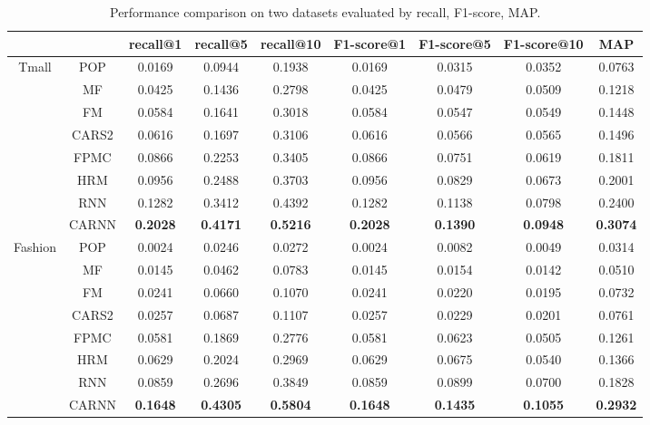 \documentclass[conference]{IEEEtran}
\begin{document}
\begin{table}[htbp]
\centering\scriptsize
\caption{Performance comparison on two datasets evaluated by recall, F1-score, MAP.}
\begin{tabular}{ccccccccc}
    \toprule
          &       & recall@1 & recall@5 & recall@10 & F1-score@1 & F1-score@5 & F1-score@10 & MAP   \\
    \midrule
    \multirow{8}[0]{*}{Tmall} 
        & POP   &0.0169    &0.0944  &0.1938  &0.0169  &0.0315  &0.0352  &0.0763 \\
        & MF    &0.0425   & 0.1436  &0.2798&  0.0425  &0.0479 & 0.0509  &0.1218 \\
        & FM   &0.0584  &0.1641  &0.3018 & 0.0584  &0.0547 & 0.0549 & 0.1448 \\
        & CARS2   &0.0616 & 0.1697  &0.3106 & 0.0616 & 0.0566 & 0.0565 & 0.1496\\
        & FPMC    &0.0866  &0.2253  &0.3405  &0.0866  &0.0751  &0.0619  &0.1811 \\
        & HRM   &0.0956  &0.2488 & 0.3703 & 0.0956 & 0.0829&  0.0673&  0.2001 \\
        & RNN   &0.1282  &0.3412&  0.4392&  0.1282 & 0.1138 &0.0798 & 0.2400 \\
        & CARNN    &\textbf{0.2028}  &\textbf{0.4171}  &\textbf{0.5216}&  \textbf{0.2028}&  \textbf{0.1390}&\textbf{ 0.0948}  &\textbf{0.3074} \\
    \midrule
    \multirow{8}[0]{*}{Fashion} 
        & POP   &0.0024  &0.0246  & 0.0272  & 0.0024   &0.0082  & 0.0049   &0.0314 \\
        & MF    & 0.0145  & 0.0462  & 0.0783  &0.0145   &0.0154   &0.0142   &0.0510 \\
        & FM   & 0.0241  &0.0660  & 0.1070   &0.0241   &0.0220  & 0.0195  & 0.0732 \\
        & CARS2   &0.0257   &0.0687  & 0.1107   &0.0257  & 0.0229   &0.0201  & 0.0761 \\
        & FPMC    & 0.0581  & 0.1869  & 0.2776  & 0.0581   &0.0623  & 0.0505  & 0.1261 \\
        & HRM   & 0.0629   &0.2024   &0.2969 &  0.0629 &  0.0675 &  0.0540   &0.1366 \\
        & RNN   & 0.0859   &0.2696 &  0.3849  & 0.0859  & 0.0899 &  0.0700   &0.1828 \\
        & CARNN    & \textbf{0.1648}   &\textbf{0.4305}  &\textbf{ 0.5804}   &\textbf{0.1648}   &\textbf{0.1435} &  \textbf{0.1055 }& \textbf{ 0.2932} \\
    \bottomrule
\end{tabular}%
\label{tab:result}%
\end{table}%
\end{document}
